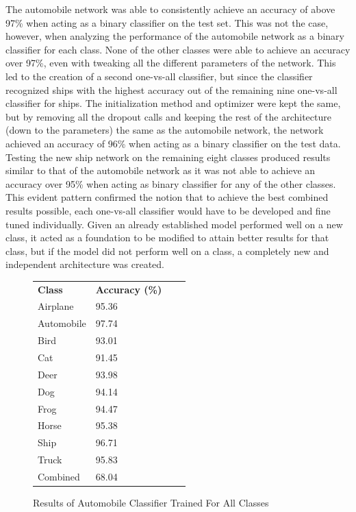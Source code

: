 \documentclass[10pt,twocolumn,letterpaper]{article}
\begin{document}
The automobile network was able to consistently achieve an accuracy of above 97\% when acting as a binary classifier on the test set. This was not the case, however, when analyzing the performance of the automobile network as a binary classifier for each class. None of the other classes were able to achieve an accuracy over 97\%, even with tweaking all the different parameters of the network. This led to the creation of a second one-vs-all classifier, but since the classifier recognized ships with the highest accuracy out of the remaining nine one-vs-all classifier for ships. The initialization method and optimizer were kept the same, but by removing all the dropout calls and keeping the rest of the architecture (down to the parameters) the same as the automobile network, the network achieved an accuracy of 96\% when acting as a binary classifier on the test data. Testing the new ship network on the remaining eight classes produced results similar to that of the automobile network as it was not able to achieve an accuracy over 95\% when acting as binary classifier for any of the other classes. This evident pattern confirmed the notion that to achieve the best combined results possible, each one-vs-all classifier would have to be developed and fine tuned individually. Given an already established model performed well on a new class, it acted as a foundation to be modified to attain better results for that class, but if the model did not perform well on a class, a completely new and independent architecture was created.

\begin{figure}[H]
	\begin{table}[H]
	\centering
		\begin{tabular}{llll}
			\textbf{Class} & \textbf{Accuracy (\%)} & \textbf{} & \textbf{} \\
			Airplane       & 95.36                  &           &           \\
			Automobile     & 97.74                  &           &           \\
			Bird           & 93.01                  &           &           \\
			Cat            & 91.45                  &           &           \\
			Deer           & 93.98                  &           &           \\
			Dog            & 94.14                  &           &           \\
			Frog           & 94.47                  &           &           \\
			Horse          & 95.38                  &           &           \\
			Ship           & 96.71                  &           &           \\
			Truck          & 95.83                  &           &           \\
			Combined       & 68.04                  &           &          
		\end{tabular}
	\end{table}
	\caption{Results of Automobile Classifier Trained For All Classes}
\end{figure}
\end{document}
